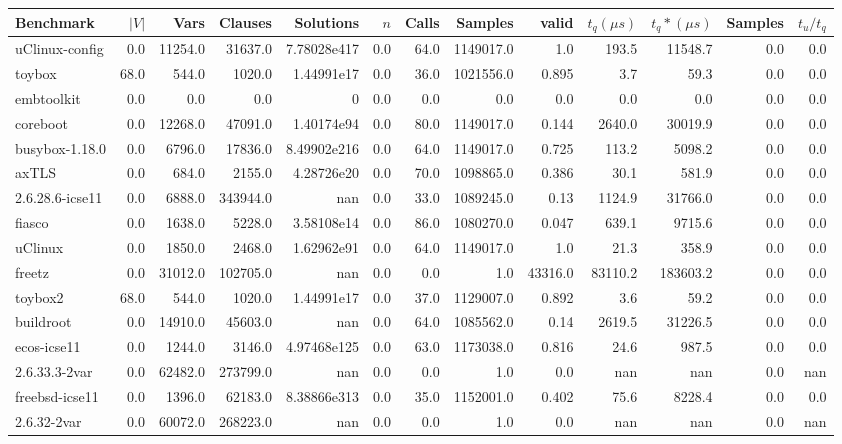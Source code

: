\begin{tabular}{|l r r r r| r r r r r r | r r|}
\hline
Benchmark & $|V|$ & Vars & Clauses & Solutions & $n$ & Calls & Samples & valid & $t_q (\mu s)$ & $t_q* (\mu s)$ & Samples & $t_u/t_q$ \\
\hline
uClinux-config & 0.0 & 11254.0 & 31637.0 & 7.78028e417 & 0.0 & 64.0 & 1149017.0 & 1.0 & 193.5 & 11548.7 & 0.0 & 0.0 \\
\hline
toybox & 68.0 & 544.0 & 1020.0 & 1.44991e17 & 0.0 & 36.0 & 1021556.0 & 0.895 & 3.7 & 59.3 & 0.0 & 0.0 \\
\hline
embtoolkit & 0.0 & 0.0 & 0.0 &  0 & 0.0 & 0.0 & 0.0 & 0.0 & 0.0 & 0.0 & 0.0 & 0.0 \\
\hline
coreboot & 0.0 & 12268.0 & 47091.0 & 1.40174e94 & 0.0 & 80.0 & 1149017.0 & 0.144 & 2640.0 & 30019.9 & 0.0 & 0.0 \\
\hline
busybox-1.18.0 & 0.0 & 6796.0 & 17836.0 & 8.49902e216 & 0.0 & 64.0 & 1149017.0 & 0.725 & 113.2 & 5098.2 & 0.0 & 0.0 \\
\hline
axTLS & 0.0 & 684.0 & 2155.0 & 4.28726e20 & 0.0 & 70.0 & 1098865.0 & 0.386 & 30.1 & 581.9 & 0.0 & 0.0 \\
\hline
2.6.28.6-icse11 & 0.0 & 6888.0 & 343944.0 & nan & 0.0 & 33.0 & 1089245.0 & 0.13 & 1124.9 & 31766.0 & 0.0 & 0.0 \\
\hline
fiasco & 0.0 & 1638.0 & 5228.0 & 3.58108e14 & 0.0 & 86.0 & 1080270.0 & 0.047 & 639.1 & 9715.6 & 0.0 & 0.0 \\
\hline
uClinux & 0.0 & 1850.0 & 2468.0 & 1.62962e91 & 0.0 & 64.0 & 1149017.0 & 1.0 & 21.3 & 358.9 & 0.0 & 0.0 \\
\hline
freetz & 0.0 & 31012.0 & 102705.0 & nan & 0.0 & 0.0 & 1.0 & 43316.0 & 83110.2 & 183603.2 & 0.0 & 0.0 \\
\hline
toybox2 & 68.0 & 544.0 & 1020.0 & 1.44991e17 & 0.0 & 37.0 & 1129007.0 & 0.892 & 3.6 & 59.2 & 0.0 & 0.0 \\
\hline
buildroot & 0.0 & 14910.0 & 45603.0 & nan & 0.0 & 64.0 & 1085562.0 & 0.14 & 2619.5 & 31226.5 & 0.0 & 0.0 \\
\hline
ecos-icse11 & 0.0 & 1244.0 & 3146.0 & 4.97468e125 & 0.0 & 63.0 & 1173038.0 & 0.816 & 24.6 & 987.5 & 0.0 & 0.0 \\
\hline
2.6.33.3-2var & 0.0 & 62482.0 & 273799.0 & nan & 0.0 & 0.0 & 1.0 & 0.0 & nan & nan & 0.0 & nan \\
\hline
freebsd-icse11 & 0.0 & 1396.0 & 62183.0 & 8.38866e313 & 0.0 & 35.0 & 1152001.0 & 0.402 & 75.6 & 8228.4 & 0.0 & 0.0 \\
\hline
2.6.32-2var & 0.0 & 60072.0 & 268223.0 & nan & 0.0 & 0.0 & 1.0 & 0.0 & nan & nan & 0.0 & nan \\
\hline
\end{tabular}